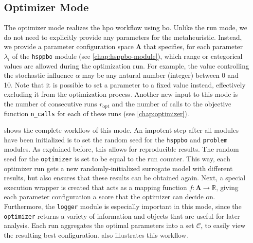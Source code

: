 \subsection{Optimizer Mode}
\label{chap:opt-mode}

The optimizer mode realizes the \glsdesc{hpo} workflow using \glsdesc{bo}. Unlike the run mode, we do not need to explicitly provide any parameters for the metaheuristic. Instead, we provide a parameter configuration space $\mathbf{\Lambda}$ that specifies, for each parameter $\lambda_i$ of the \texttt{hsppbo} module (see \cref{chap:hsppbo-module}), which range or categorical values are allowed during the optimization run. For example, the value controlling the stochastic influence $\alpha$ may be any natural number (integer) between 0 and 10. Note that it is possible to set a parameter to a fixed value instead, effectively excluding it from the optimization process. Another new input to this mode is the number of consecutive runs $r_{\text{opt}}$ and the number of calls to the objective function \texttt{n\_calls} for each of these runs (see \cref{chap:optimizer}).

 shows the complete workflow of this mode. An impotent step after all modules have been initialized is to set the random seed for the \texttt{hsppbo} and \texttt{problem} modules. As explained before, this allows for reproducible results. The random seed for the \texttt{optimizer} is set to be equal to the run counter. This way, each optimizer run gets a new randomly-initialized surrogate model with different results, but also ensures that these results can be obtained again. Next, a special execution wrapper is created that acts as a mapping function $f: \mathcal{\mathbf{\Lambda}} \to \mathbb{R}$, giving each parameter configuration a score that the optimizer can decide on. Furthermore, the \texttt{logger} module is especially important in this mode, since the \texttt{optimizer} returns a variety of information and objects that are useful for later analysis. Each run aggregates the optimal parameters into a set $\mathcal{C}$, to easily view the resulting best configuration.  also illustrates this workflow.

